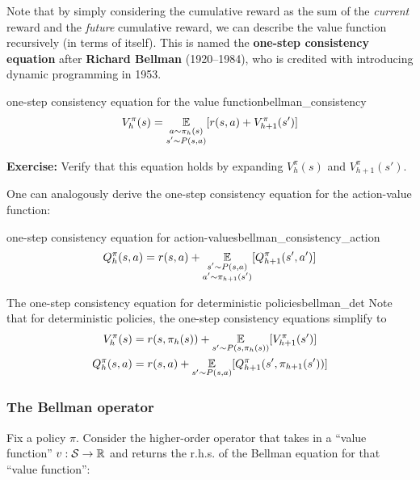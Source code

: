 \documentclass[\main/main]{subfiles}
\begin{document}
Note that by simply considering the cumulative reward as the sum of the \emph{current} reward and the \emph{future} cumulative reward, we can describe the value function recursively (in terms of itself). This is named the \textbf{one-step consistency equation} after \textbf{Richard Bellman} (1920--1984), who is credited with introducing dynamic programming in 1953.

\begin{definition}{one-step consistency equation for the value function}{bellman_consistency}
\begin{equation}
    V_h^\pi(s) = \operatorname*{\mathbb{E}}_{\substack{a \sim \pi_h(s) \\ s' \sim P(s, a)}} [r(s, a) + V_{h+1}^\pi(s')] \label{eq:bellman_consistency}
\end{equation}
\end{definition}


\textbf{Exercise:} Verify that this equation holds by expanding $V_h^\pi(s)$ and $V_{h+1}^\pi(s')$.

One can analogously derive the one-step consistency equation for the action-value function:

\begin{definition}{one-step consistency equation for action-values}{bellman_consistency_action}
\[
    Q_h^\pi(s, a) = r(s, a) + \operatorname*{\mathbb{E}}_{\substack{s' \sim P(s, a) \\ a' \sim \pi_{h+1}(s')}} [Q_{h+1}^\pi(s', a')]
\]
\end{definition}

\begin{theorem}{The one-step consistency equation for deterministic policies}{bellman_det}
    Note that for deterministic policies, the one-step consistency equations simplify to
    \begin{align*}
        V_h^\pi(s) &= r(s, \pi_h(s)) + \operatorname*{\mathbb{E}}_{s' \sim P(s, \pi_h(s))} [V_{h+1}^\pi(s')] \\
        Q_h^\pi(s, a) &= r(s, a) + \operatorname*{\mathbb{E}}_{s' \sim P(s, a)} [Q_{h+1}^\pi(s', \pi_{h+1}(s'))]
    \end{align*}
\end{theorem}

\subsubsection{The Bellman operator}
\label{sec:bellman_operator}

Fix a policy $\pi$. Consider the higher-order operator that takes in a ``value function'' $v : \mathcal{S} \to \mathbb{R}$ and returns the r.h.s. of the Bellman equation for that ``value function'':
\end{document}
